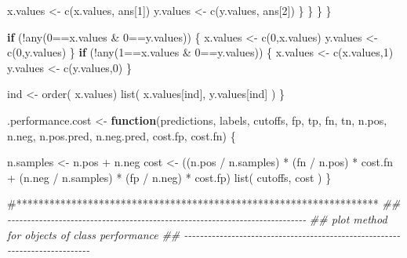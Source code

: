 \documentclass[
  letterpaper,
  DIV=11,
  numbers=noendperiod]{scrartcl}
\newenvironment{Shaded}{\begin{snugshade}}{\end{snugshade}}
\newcommand{\CommentTok}[1]{\textcolor[rgb]{0.37,0.37,0.37}{#1}}
\newcommand{\ControlFlowTok}[1]{\textcolor[rgb]{0.00,0.23,0.31}{\textbf{#1}}}
\newcommand{\DecValTok}[1]{\textcolor[rgb]{0.68,0.00,0.00}{#1}}
\newcommand{\DocumentationTok}[1]{\textcolor[rgb]{0.37,0.37,0.37}{\textit{#1}}}
\newcommand{\FunctionTok}[1]{\textcolor[rgb]{0.28,0.35,0.67}{#1}}
\newcommand{\NormalTok}[1]{\textcolor[rgb]{0.00,0.23,0.31}{#1}}
\newcommand{\OtherTok}[1]{\textcolor[rgb]{0.00,0.23,0.31}{#1}}
\newcommand{\SpecialCharTok}[1]{\textcolor[rgb]{0.37,0.37,0.37}{#1}}
\begin{document}
\begin{Shaded}
\begin{Highlighting}[]
\NormalTok{                      x.values }\OtherTok{\textless{}{-}} \FunctionTok{c}\NormalTok{(x.values, ans[}\DecValTok{1}\NormalTok{])}
\NormalTok{                      y.values }\OtherTok{\textless{}{-}} \FunctionTok{c}\NormalTok{(y.values, ans[}\DecValTok{2}\NormalTok{])}
\NormalTok{                  \}}
\NormalTok{              \}}
\NormalTok{          \}}
\NormalTok{      \}}

      \ControlFlowTok{if}\NormalTok{ (}\SpecialCharTok{!}\FunctionTok{any}\NormalTok{(}\DecValTok{0}\SpecialCharTok{==}\NormalTok{x.values }\SpecialCharTok{\&} \DecValTok{0}\SpecialCharTok{==}\NormalTok{y.values)) \{}
\NormalTok{          x.values }\OtherTok{\textless{}{-}} \FunctionTok{c}\NormalTok{(}\DecValTok{0}\NormalTok{,x.values)}
\NormalTok{          y.values }\OtherTok{\textless{}{-}} \FunctionTok{c}\NormalTok{(}\DecValTok{0}\NormalTok{,y.values)}
\NormalTok{      \}}
      \ControlFlowTok{if}\NormalTok{ (}\SpecialCharTok{!}\FunctionTok{any}\NormalTok{(}\DecValTok{1}\SpecialCharTok{==}\NormalTok{x.values }\SpecialCharTok{\&} \DecValTok{0}\SpecialCharTok{==}\NormalTok{y.values)) \{}
\NormalTok{          x.values }\OtherTok{\textless{}{-}} \FunctionTok{c}\NormalTok{(x.values,}\DecValTok{1}\NormalTok{)}
\NormalTok{          y.values }\OtherTok{\textless{}{-}} \FunctionTok{c}\NormalTok{(y.values,}\DecValTok{0}\NormalTok{)}
\NormalTok{      \}}

\NormalTok{      ind }\OtherTok{\textless{}{-}} \FunctionTok{order}\NormalTok{( x.values)}
      \FunctionTok{list}\NormalTok{( x.values[ind], y.values[ind] )}
\NormalTok{  \}}


\NormalTok{.performance.cost }\OtherTok{\textless{}{-}}
  \ControlFlowTok{function}\NormalTok{(predictions, labels, cutoffs, fp, tp, fn, tn,}
\NormalTok{           n.pos, n.neg, n.pos.pred, n.neg.pred, cost.fp, cost.fn) \{}
      
\NormalTok{    n.samples }\OtherTok{\textless{}{-}}\NormalTok{ n.pos }\SpecialCharTok{+}\NormalTok{ n.neg}
\NormalTok{    cost }\OtherTok{\textless{}{-}}\NormalTok{ ((n.pos }\SpecialCharTok{/}\NormalTok{ n.samples) }\SpecialCharTok{*}\NormalTok{ (fn }\SpecialCharTok{/}\NormalTok{ n.pos) }\SpecialCharTok{*}\NormalTok{ cost.fn }\SpecialCharTok{+}
\NormalTok{             (n.neg }\SpecialCharTok{/}\NormalTok{ n.samples) }\SpecialCharTok{*}\NormalTok{ (fp }\SpecialCharTok{/}\NormalTok{ n.neg) }\SpecialCharTok{*}\NormalTok{ cost.fp)}
    \FunctionTok{list}\NormalTok{( cutoffs, cost )}
\NormalTok{\}}

\CommentTok{\#******************************************************************}
\DocumentationTok{\#\# {-}{-}{-}{-}{-}{-}{-}{-}{-}{-}{-}{-}{-}{-}{-}{-}{-}{-}{-}{-}{-}{-}{-}{-}{-}{-}{-}{-}{-}{-}{-}{-}{-}{-}{-}{-}{-}{-}{-}{-}{-}{-}{-}{-}{-}{-}{-}{-}{-}{-}{-}{-}{-}{-}{-}{-}{-}{-}{-}{-}{-}{-}{-}{-}{-}{-}{-}{-}{-}{-}{-}{-}{-}{-}{-}{-}}
\DocumentationTok{\#\# plot method for objects of class \textquotesingle{}performance\textquotesingle{}}
\DocumentationTok{\#\# {-}{-}{-}{-}{-}{-}{-}{-}{-}{-}{-}{-}{-}{-}{-}{-}{-}{-}{-}{-}{-}{-}{-}{-}{-}{-}{-}{-}{-}{-}{-}{-}{-}{-}{-}{-}{-}{-}{-}{-}{-}{-}{-}{-}{-}{-}{-}{-}{-}{-}{-}{-}{-}{-}{-}{-}{-}{-}{-}{-}{-}{-}{-}{-}{-}{-}{-}{-}{-}{-}{-}{-}{-}{-}{-}{-}}


\end{Highlighting}
\end{Shaded}
\end{document}
